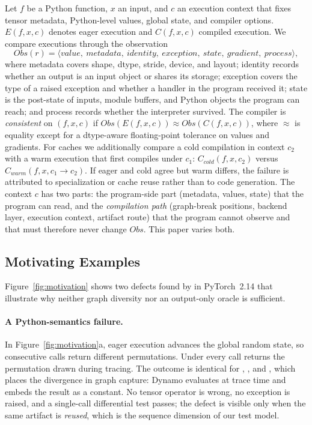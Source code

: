 Let $f$ be a Python function, $x$ an input, and $c$ an execution context that fixes tensor metadata, Python-level
values, global state, and compiler options. $E(f,x,c)$ denotes eager execution and $C(f,x,c)$ compiled execution.
We compare executions through the observation
\[
\mathit{Obs}(r)=\langle \mathit{value},\ \mathit{metadata},\ \mathit{identity},\ \mathit{exception},\ \mathit{state},\ \mathit{gradient},\ \mathit{process}\rangle ,
\]
where metadata covers shape, dtype, stride, device, and layout; identity records whether an output is an input
object or shares its storage; exception covers the type of a raised exception and whether a handler in the
program received it; state is the post-state of inputs, module buffers, and Python objects the program can
reach; and process records whether the interpreter survived. The compiler is \emph{consistent} on $(f,x,c)$ if
$\mathit{Obs}(E(f,x,c)) \approx \mathit{Obs}(C(f,x,c))$, where $\approx$ is equality except for a dtype-aware
floating-point tolerance on values and gradients. For caches we additionally compare a cold compilation in
context $c_2$ with a warm execution that first compiles under $c_1$:
$C_{\mathit{cold}}(f,x,c_2)$ versus $C_{\mathit{warm}}(f,x,c_1\!\rightarrow\!c_2)$. If eager and cold agree but warm
differs, the failure is attributed to specialization or cache reuse rather than to code generation. The context
$c$ has two parts: the program-side part (metadata, values, state) that the program can read, and the
\emph{compilation path} (graph-break positions, backend layer, execution context, artifact route) that the
program cannot observe and that must therefore never change $\mathit{Obs}$. This paper varies both.

\subsection{Motivating Examples}
\label{sec:motivation}



Figure~\ref{fig:motivation} shows two defects found by \tool in PyTorch~2.14 that illustrate why neither graph
diversity nor an output-only oracle is sufficient.

\paragraph{A Python-semantics failure.} In Figure~\ref{fig:motivation}a, eager execution advances the global
random state, so consecutive calls return different permutations. Under \tcompile every call returns the
permutation drawn during tracing. The outcome is identical for \EO, \ET, and \ER, which places the divergence
in graph capture: Dynamo evaluates  at trace time and embeds the result as a constant. No
tensor operator is wrong, no exception is raised, and a single-call differential test passes; the defect is
visible only when the same artifact is \emph{reused}, which is the sequence dimension of our test model.

